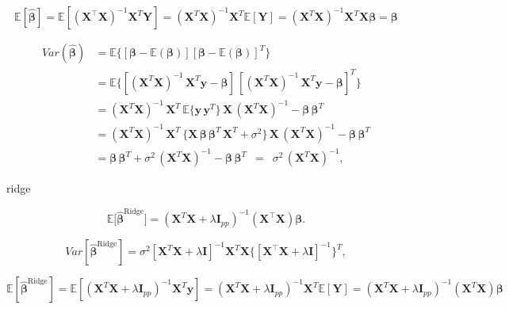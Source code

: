\documentclass[twoside,11pt]{report}
\begin{document}
$$
\mathbb{E}[\mathbf{\hat{\beta}}] = \mathbb{E}[ (\mathbf{X}^{\top} \mathbf{X})^{-1}\mathbf{X}^{T} \mathbf{Y}]=(\mathbf{X}^{T} \mathbf{X})^{-1}\mathbf{X}^{T} \mathbb{E}[ \mathbf{Y}]=(\mathbf{X}^{T} \mathbf{X})^{-1} \mathbf{X}^{T}\mathbf{X}\mathbf{\beta}=\mathbf{\beta}
$$


\begin{align*}
Var(\mathbf{\hat{\beta}}) & = \mathbb{E} \{ [\mathbf{\beta} - \mathbb{E}(\mathbf{\beta})] [\mathbf{\beta} - \mathbb{E}(\mathbf{\beta})]^{T} \}
\\
& = \mathbb{E} \{ [(\mathbf{X}^{T} \mathbf{X})^{-1} \, \mathbf{X}^{T} \mathbf{y} - \mathbf{\beta}] \, [(\mathbf{X}^{T} \mathbf{X})^{-1} \, \mathbf{X}^{T} \mathbf{y} - \mathbf{\beta}]^{T} \}
\\
& = (\mathbf{X}^{T} \mathbf{X})^{-1} \, \mathbf{X}^{T} \, \mathbb{E} \{ \mathbf{y} \, \mathbf{y}^{T} \} \, \mathbf{X} \, (\mathbf{X}^{T} \mathbf{X})^{-1} - \mathbf{\beta} \, \mathbf{\beta}^{T}
\\
& = (\mathbf{X}^{T} \mathbf{X})^{-1} \, \mathbf{X}^{T} \, \{ \mathbf{X} \, \mathbf{\beta} \, \mathbf{\beta}^{T} \,  \mathbf{X}^{T} + \sigma^2 \} \, \mathbf{X} \, (\mathbf{X}^{T} \mathbf{X})^{-1} - \mathbf{\beta} \, \mathbf{\beta}^{T}
\\
& = \mathbf{\beta} \, \mathbf{\beta}^{T}  + \sigma^2 \, (\mathbf{X}^{T} \mathbf{X})^{-1} - \mathbf{\beta} \, \mathbf{\beta}^{T}
\, \, \, = \, \, \, \sigma^2 \, (\mathbf{X}^{T} \mathbf{X})^{-1},
\end{align*}



ridge


$$
\mathbb{E} \big[ \hat{\mathbf{\beta}}^{\mathrm{Ridge}} \big]=(\mathbf{X}^{T} \mathbf{X} + \lambda \mathbf{I}_{pp})^{-1} (\mathbf{X}^{\top} \mathbf{X})\mathbf{\beta}.
$$


$$
{Var}[\hat{\mathbf{\beta}}^{\mathrm{Ridge}}]=\sigma^2[  \mathbf{X}^{T} \mathbf{X} + \lambda \mathbf{I} ]^{-1}  \mathbf{X}^{T}\mathbf{X} \{ [  \mathbf{X}^{\top} \mathbf{X} + \lambda \mathbf{I} ]^{-1}\}^{T},
$$


$$
\mathbb{E}[\mathbf{\hat{\beta}}^{\mathrm{Ridge}}] = \mathbb{E}\left[ \left(\mathbf{X}^T\mathbf{X}+\lambda\mathbf{I}_{pp}\right)^{-1}\mathbf{X}^T\mathbf{y}\right]=\left(\mathbf{X}^T\mathbf{X}+\lambda\mathbf{I}_{pp}\right)^{-1}\mathbf{X}^T \mathbb{E}[ \mathbf{Y}]=\left(\mathbf{X}^T\mathbf{X}+\lambda\mathbf{I}_{pp}\right)^{-1}\left(\mathbf{X}^T  \mathbf{X}\right)\mathbf{\beta}
$$
\end{document}
